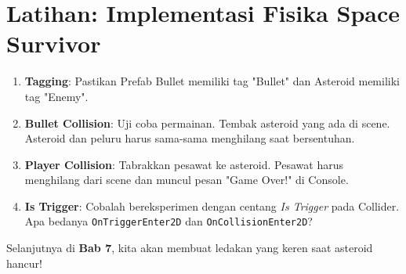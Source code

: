 
\section{Latihan: Implementasi Fisika Space Survivor}

\begin{enumerate}
    \item \textbf{Tagging}: Pastikan Prefab Bullet memiliki tag "Bullet" dan Asteroid memiliki tag "Enemy".
    \item \textbf{Bullet Collision}: Uji coba permainan. Tembak asteroid yang ada di scene. Asteroid dan peluru harus sama-sama menghilang saat bersentuhan.
    \item \textbf{Player Collision}: Tabrakkan pesawat ke asteroid. Pesawat harus menghilang dari scene dan muncul pesan "Game Over!" di Console.
    \item \textbf{Is Trigger}: Cobalah bereksperimen dengan centang \textit{Is Trigger} pada Collider. Apa bedanya \texttt{OnTriggerEnter2D} dan \texttt{OnCollisionEnter2D}?
\end{enumerate}

Selanjutnya di \textbf{Bab 7}, kita akan membuat ledakan yang keren saat asteroid hancur!
